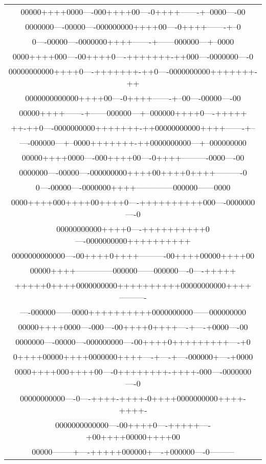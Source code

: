 \begin{table}%
{\footnotesize\tt
\begin{center}\begin{tabular}{c}
00000++++0000----000++++00----0++++-------+--0000----00\\
0000000----00000----000000000++++00----0++++-------+--0\\
0----00000----0000000++++-------+------000000---+--0000\\
0000++++000----00++++0----+++++++-++000----0000000----0\\
00000000000++++0----+++++++-++0----0000000000+++++++-++\\
0000000000000++++00----0++++-------+--00----00000----00\\
00000++++-------+------000000---+--000000++++0----+++++\\
++-++0----0000000000+++++++-++00000000000++++-------+--\\
----000000---+--0000+++++++-++0000000000---+--000000000\\[2mm]
00000++++0000----000++++00----0++++----------0000----00\\
0000000----00000----000000000++++00++++0++++----------0\\
0----00000----0000000++++--------------000000------0000\\
0000++++000++++00++++0----++++++++++000----0000000----0\\
00000000000++++0----++++++++++0----0000000000++++++++++\\
0000000000000----00++++0++++----------00++++00000++++00\\
00000++++--------------000000------000000----0----+++++\\
+++++0++++0000000000++++++++++00000000000++++----------\\
----000000------0000++++++++++0000000000------000000000\\[2mm]
00000++++0000----000----00++++0++++----+----+0000----00\\
0000000----00000----000000000----00++++0+++++++++----+0\\
0++++00000++++0000000++++----+----+----000000+----+0000\\
0000++++000++++00----0++++++++-++++-000----0000000----0\\
00000000000----0----++++-++++-0++++0000000000++++-++++-\\
0000000000000----00++++0----+++++----+00++++00000++++00\\
00000--------+----+++++000000+----+000000----0---------\\

\end{tabular}
\end{center}}
\end{table}
